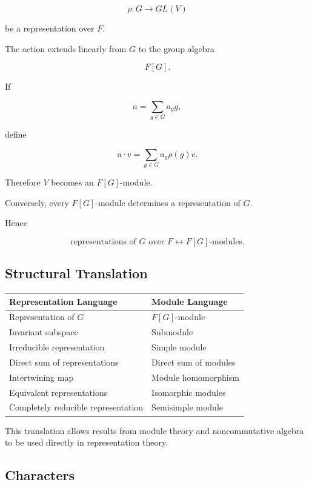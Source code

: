 \[ \rho:G\to GL(V) \]

be a representation over \(F\).

The action extends linearly from \(G\) to the group algebra

\[ F[G]. \]

If

\[ a=\sum_{g\in G}a_gg, \]

define

\[ a\cdot v=\sum_{g\in G}a_g\rho(g)v. \]

Therefore \(V\) becomes an \(F[G]\)-module.

Conversely, every \(F[G]\)-module determines a representation of \(G\).

Hence

\[ \boxed{\text{representations of }G\text{ over }F
\longleftrightarrow
F[G]\text{-modules}.} \]

\subsection{Structural Translation}
\label{subsec:representation-module-translation}

\begin{center}
\begin{tabularx}{0.9\textwidth}{@{}XX@{}}
\toprule
\textbf{Representation Language} & \textbf{Module Language}\\
\midrule
Representation of \(G\) & \(F[G]\)-module\\
Invariant subspace & Submodule\\
Irreducible representation & Simple module\\
Direct sum of representations & Direct sum of modules\\
Intertwining map & Module homomorphism\\
Equivalent representations & Isomorphic modules\\
Completely reducible representation & Semisimple module\\
\bottomrule
\end{tabularx}
\end{center}

This translation allows results from module theory and noncommutative algebra
to be used directly in representation theory.

\subsection{Characters}
\label{subsec:characters}


